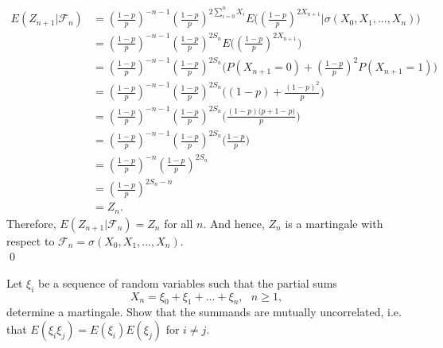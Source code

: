 \documentclass[10pt]{amsart}
\begin{document}
\begin{align*}
E (Z_{n + 1} | \mathcal F_n) &= \left(\frac{1-p}{p} \right)^{- n - 1} \left(\frac{1-p}{p} \right)^{2\sum_{i=0}^{n} X_i} E \Bigg(\left(\frac{1-p}{p} \right)^{2X_{n + 1}} \Bigg| \sigma(X_0, X_1, ...,  X_n)\Bigg) \\
	&= \left(\frac{1-p}{p} \right)^{- n - 1} \left(\frac{1-p}{p} \right)^{2S_n} E \Bigg(\left(\frac{1-p}{p} \right)^{2X_{n + 1}}\Bigg) \\
	&= \left(\frac{1-p}{p} \right)^{- n - 1} \left(\frac{1-p}{p} \right)^{2S_n} \Bigg(P(X_{n + 1} = 0)  + \left(\frac{1-p}{p} \right)^2P(X_{n + 1} = 1)\Bigg) \\
	&= \left(\frac{1-p}{p} \right)^{- n - 1} \left(\frac{1-p}{p} \right)^{2S_n} \Bigg((1 - p)  + \frac{(1-p)^2}{p}\Bigg) \\
	&= \left(\frac{1-p}{p} \right)^{- n - 1} \left(\frac{1-p}{p} \right)^{2S_n} \Bigg(\frac{(1 - p)\big(p + 1 - p\big)}{p}\Bigg) \\
	&= \left(\frac{1-p}{p} \right)^{- n - 1} \left(\frac{1-p}{p} \right)^{2S_n} \Bigg(\frac{1 - p}{p} \Bigg) \\
	&= \left(\frac{1-p}{p} \right)^{- n} \left(\frac{1-p}{p} \right)^{2S_n} \\
	&=\left(\frac{1-p}{p} \right)^{2S_n - n} \\
	&= Z_n.
\end{align*}
Therefore, $E (Z_{n + 1} | \mathcal F_n)  = Z_n$ for all $n$.
And hence, $Z_n$ is a martingale with respect to $\mathcal{F}_n = \sigma(X_0, X_1, . . . , X_n )$. \\
\qed \\


\newpage

 Let $\xi_i$ be a sequence of random variables such that the partial sums 
$$X_n=\xi_0+\xi_1+...+\xi_n, \,\,\,\, n\geq 1,$$
determine a martingale. Show that the summands are mutually uncorrelated, i.e. that $E(\xi_i\xi_j)=E(\xi_i)E(\xi_j)$ for $i\neq j$. \\
\end{document}

